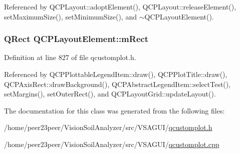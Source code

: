 Referenced by Q\+C\+P\+Layout\+::adopt\+Element(), Q\+C\+P\+Layout\+::release\+Element(), set\+Maximum\+Size(), set\+Minimum\+Size(), and $\sim$\+Q\+C\+P\+Layout\+Element().

\hypertarget{class_q_c_p_layout_element_ad8896f05550389f7b9e92c9e6cdf6e01}{}
\subsubsection[{m\+Rect}]{\setlength{\rightskip}{0pt plus 5cm}Q\+Rect Q\+C\+P\+Layout\+Element\+::m\+Rect\hspace{0.3cm}{\ttfamily [protected]}}\label{class_q_c_p_layout_element_ad8896f05550389f7b9e92c9e6cdf6e01}


Definition at line 827 of file qcustomplot.\+h.



Referenced by Q\+C\+P\+Plottable\+Legend\+Item\+::draw(), Q\+C\+P\+Plot\+Title\+::draw(), Q\+C\+P\+Axis\+Rect\+::draw\+Background(), Q\+C\+P\+Abstract\+Legend\+Item\+::select\+Test(), set\+Margins(), set\+Outer\+Rect(), and Q\+C\+P\+Layout\+Grid\+::update\+Layout().



The documentation for this class was generated from the following files\+:\begin{DoxyCompactItemize}
\item 
/home/peer23peer/\+Vision\+Soil\+Analyzer/src/\+V\+S\+A\+G\+U\+I/\hyperlink{qcustomplot_8h}{qcustomplot.\+h}\item 
/home/peer23peer/\+Vision\+Soil\+Analyzer/src/\+V\+S\+A\+G\+U\+I/\hyperlink{qcustomplot_8cpp}{qcustomplot.\+cpp}\end{DoxyCompactItemize}
